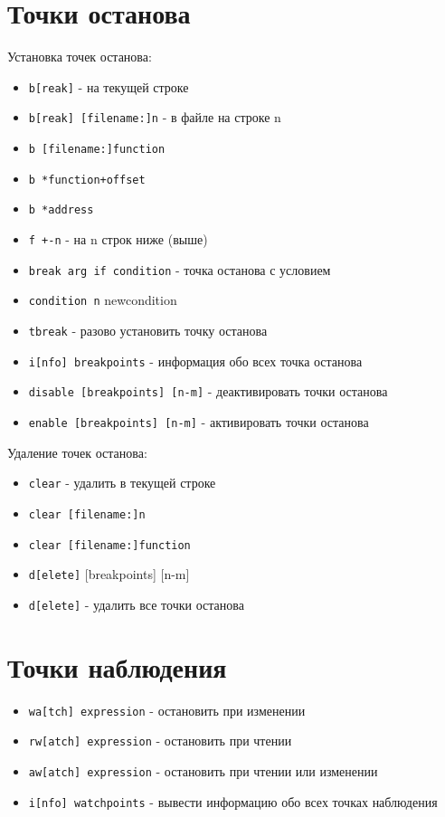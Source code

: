 \section{Точки останова}

Установка точек останова:
\begin{itemize}
	\setlength{\itemsep}{0pt}
	\setlength{\parskip}{0pt}
	\item \texttt{b[reak]} - на текущей строке
	\item \texttt{b[reak] [filename:]n} - в файле на строке n
	\item \texttt{b [filename:]function}
	\item \texttt{b *function+offset}
	\item \texttt{b *address}
	\item \texttt{f +-n} - на n строк ниже (выше)
	\item \texttt{break arg if condition} - точка останова с условием
	\item \texttt{condition n} newcondition
	\item \texttt{tbreak} - разово установить точку останова
	\item \texttt{i[nfo] breakpoints} - информация обо всех точка останова
	\item \texttt{disable [breakpoints] [n-m]} - деактивировать точки останова
	\item \texttt{enable [breakpoints] [n-m]} - активировать точки останова
\end{itemize}

Удаление точек останова:
\begin{itemize}
	\setlength{\itemsep}{0pt}
	\setlength{\parskip}{0pt}
	\item \texttt{clear} - удалить в текущей строке
	\item \texttt{clear [filename:]n}
	\item \texttt{clear [filename:]function}
	\item \texttt{d[elete]} [breakpoints] [n-m]
	\item \texttt{d[elete]} - удалить все точки останова
\end{itemize}

\section{Точки наблюдения}
\begin{itemize}
	\setlength{\itemsep}{0pt}
	\setlength{\parskip}{0pt}
	\item \texttt{wa[tch] expression} - остановить при изменении
	\item \texttt{rw[atch] expression} - остановить при чтении
	\item \texttt{aw[atch] expression} - остановить при чтении или изменении
	\item \texttt{i[nfo] watchpoints} - вывести информацию обо всех точках наблюдения
\end{itemize}

